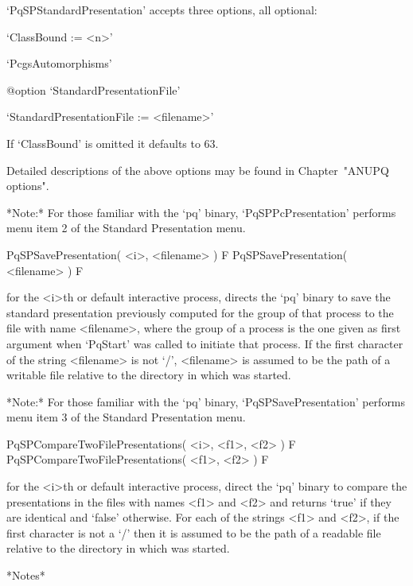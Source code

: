`PqSPStandardPresentation' accepts three options, all optional:

\beginlist%

\item{}`ClassBound := <n>'

\item{}`PcgsAutomorphisms'

%
{@option \noexpand`StandardPresentationFile'}
\item{}`StandardPresentationFile := <filename>'

\endlist

If `ClassBound' is omitted it defaults to 63.

Detailed descriptions of the above options may be found in Chapter~"ANUPQ
options".

*Note:* For those familiar with  the  `pq'  binary,  `PqSPPcPresentation'
performs menu item 2 of the Standard Presentation menu.

\>PqSPSavePresentation( <i>, <filename> ) F
\>PqSPSavePresentation( <filename> ) F

for the <i>th or default interactive {\ANUPQ} process, directs  the  `pq'
binary to save the standard  presentation  previously  computed  for  the
group of that process to the file with name <filename>, where  the  group
of a process is the one given as first argument when `PqStart' was called
to initiate that process. If the first character of the string <filename>
is not `/', <filename> is assumed to be  the  path  of  a  writable  file
relative to the directory in which {\GAP} was started.

*Note:* For those familiar with the `pq'  binary,  `PqSPSavePresentation'
performs menu item 3 of the Standard Presentation menu.

\>PqSPCompareTwoFilePresentations( <i>, <f1>, <f2> ) F
\>PqSPCompareTwoFilePresentations( <f1>, <f2> ) F

for the <i>th or default interactive {\ANUPQ} process, direct  the  `pq'
binary to compare the presentations in the files with names <f1> and <f2>
and returns `true' if they are identical and `false' otherwise. For  each
of the strings <f1> and <f2>, if the first character is not a `/' then it
is assumed to be the path of a readable file relative to the directory in
which {\GAP} was started.

*Notes*

